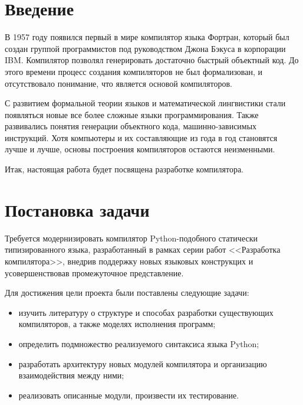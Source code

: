 \newpage
\section*{Введение}

В 1957 году появился первый в мире компилятор языка Фортран, который был создан группой программистов под руководством Джона Бэкуса в корпорации IBM.
Компилятор позволял генерировать достаточно быстрый объектный код.
До этого времени процесс создания компиляторов не был формализован, и отсутствовало понимание, что является основой компиляторов.

С развитием формальной теории языков и математической лингвистики стали появляться новые все более сложные языки программирования.
Также развивались понятия генерации объектного кода, машинно-зависимых инструкций.
Хотя компьютеры и их составляющие из года в год становятся лучше и лучше, основы построения компиляторов остаются неизменными.

Итак, настоящая работа будет посвящена разработке компилятора.

\newpage
\section*{Постановка задачи}

Требуется модернизировать компилятор Python-подобного статически типизированного языка, разработанный в рамках серии работ <<Разработка компилятора>>\footnotemark, внедрив поддержку новых языковых конструкцих и усовершенствовав промежуточное представление.

Для достижения цели проекта были поставлены следующие задачи:

\begin{itemize}
    \item изучить литературу о структуре и способах разработки существующих компиляторов, а также моделях исполнения программ;
    \item определить подмножество реализуемого синтаксиса языка Python;
    \item разработать архитектуру новых модулей компилятора и организацию взаимодействия между ними;
    \item реализовать описанные модули, произвести их тестирование.
\end{itemize}

